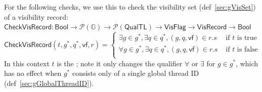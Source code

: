 

For the following checks, we use this to check the visibility set (def~\ref{sec:gVisSet}) of a visibility record: \\
$\mathsf{CheckVisRecord}: \mathsf{Bool} \to \mathcal{P}(\mathbb{G}) \to \mathcal{P}(\mathsf{QualTL}) \to \mathsf{VisFlag} \to \mathsf{VisRecord} \to \mathsf{Bool}$
\begin{equation*}
    \mathsf{CheckVisRecord}(t, g^*, q^*, \mathsf{vf}, r) = \begin{cases}
        \exists g \in g^*, \exists q \in q^*, (g, q, \mathsf{vf}) \in r.s & \text{ if $t$ is true} \\
        \forall g \in g^*, \exists q \in q^*, (g, q, \mathsf{vf}) \in r.s & \text{ if $t$ is false} \\
    \end{cases}
\end{equation*}
In this context $t$ is the ; note it only changes the qualifier $\forall$ or $\exists$ for $g \in g^*$, which has no effect when $g^*$ consists only of a single global thread ID (def~\ref{sec:gGlobalThreadID}).

